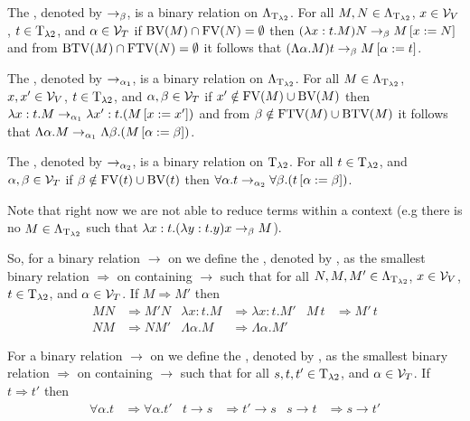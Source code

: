 \begin{definition}\label{def.2.6}
The , denoted by $\rightarrow_\beta$, is a binary relation on $\Lambda_{\text{T}_{\lambda2}}$. For all $M,N\in\Lambda_{\text{T}_{\lambda2}}$, $x\in\mathcal{V}_V$, $t\in\text{T}_{\lambda2}$, and $\alpha\in\mathcal{V}_T$ if $\text{BV}(M)\cap\text{FV}(N)=\emptyset$ then $(\lambda x:t.M)N\rightarrow_\beta M\left[x:=N\right]$ and from $\text{BTV}(M)\cap\text{FTV}(N)=\emptyset$ it follows that $(\Lambda\alpha.M)t\rightarrow_\beta M\left[\alpha:=t\right]$.

The , denoted by $\rightarrow_{\alpha_1}$, is a binary relation on $\Lambda_{\text{T}_{\lambda2}}$. For all $M\in\Lambda_{\text{T}_{\lambda2}}$, $x,x'\in\mathcal{V}_V$, $t\in\text{T}_{\lambda2}$, and $\alpha,\beta\in\mathcal{V}_T$ if $x'\notin\text{FV}(M)\cup\text{BV}(M)$ then $\lambda x:t.M\rightarrow_{\alpha_1}\lambda x':t.(M\left[x:=x'\right])$ and from $\beta\notin\text{FTV}(M)\cup\text{BTV}(M)$ it follows that $\Lambda \alpha.M\rightarrow_{\alpha_1}\Lambda \beta.(M\left[\alpha:=\beta\right])$.

The , denoted by $\rightarrow_{\alpha_2}$, is a binary relation on $\text{T}_{\lambda2}$. For all $t\in\text{T}_{\lambda2}$, and $\alpha,\beta\in\mathcal{V}_T$ if $\beta\notin\text{FV}(t)\cup\text{BV}(t)$ then $\forall\alpha.t\rightarrow_{\alpha_2}\forall\beta.(t\left[\alpha:=\beta\right])$.
\end{definition}

Note that right now we are not able to reduce terms within a context (e.g there is no $M\in\Lambda_{\text{T}_{\lambda2}}$ such that $\lambda x:t.(\lambda y:t.y)x\rightarrow_\beta M$).

\begin{definition}\label{def.2.7}
So, for a binary relation $\rightarrow$ on \lambdaTerms{} we define the , denoted by \lambdaTermContext{\rightarrow}, as the smallest binary relation $\Rightarrow$ on \lambdaTerms{} containing $\rightarrow$ such that for all $N,M,M'\in\Lambda_{\text{T}_{\lambda2}}$, $x\in\mathcal{V}_V$, $t\in\text{T}_{\lambda2}$, and $\alpha\in\mathcal{V}_T$. If $M\Rightarrow M'$ then
\begin{align*}
MN&\Rightarrow M'N      & \lambda x:t.M&\Rightarrow\lambda x:t.M' & M\,t&\Rightarrow M'\,t \\
NM&\Rightarrow NM'   & \Lambda\alpha.M&\Rightarrow \Lambda\alpha.M'   
\end{align*}

For a binary relation $\rightarrow$ on \lambdaTypes{} we define the , denoted by \lambdaTypeContext{\rightarrow}, as the smallest binary relation $\Rightarrow$ on \lambdaTypes{} containing $\rightarrow$ such that for all $s,t,t'\in\text{T}_{\lambda2}$, and $\alpha\in\mathcal{V}_T$. If $t\Rightarrow t'$ then
\begin{align*}
\forall\alpha.t&\Rightarrow\forall\alpha.t'        & t\to s&\Rightarrow t'\to s      & s\to t&\Rightarrow s\to t'
\end{align*}
\end{definition}

